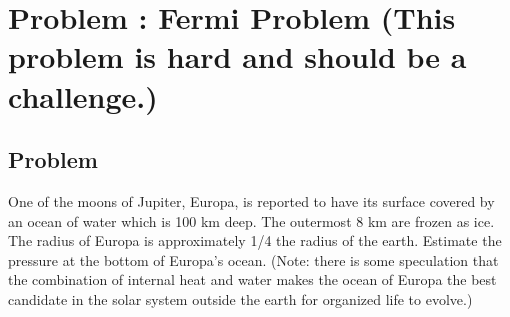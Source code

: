 \documentclass[solutions]{esg8012pset}
\date{September 8}
\begin{document}
\section{Problem \thesection: Fermi Problem (This problem is hard and should be a challenge.)}
\subsection{Problem}
  One of the moons of Jupiter, Europa, is reported to have its surface covered by an ocean of water
  which is 100 km deep.  The outermost 8 km are frozen as ice. The radius of Europa is
  approximately 1/4 the radius of the earth. Estimate the pressure at the bottom of Europa's ocean.
  (Note: there is some speculation that the combination of internal heat and water makes the ocean
  of Europa the best candidate in the solar system outside the earth for organized life to evolve.)
\end{document}
